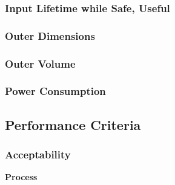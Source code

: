 \documentclass{report}
\begin{document}
\subsubsection{Input Lifetime while Safe, Useful} %

\subsubsection{Outer Dimensions} %

\subsubsection{Outer Volume} %

\subsubsection{Power Consumption} %

\subsubsection{}
 
\subsection{Performance Criteria}
\subsubsection{Acceptability}

\textbf{Process}


\end{document}
